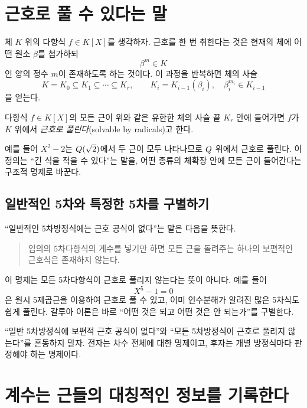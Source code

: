 \section{근호로 풀 수 있다는 말}

체 $K$ 위의 다항식 $f\in K[X]$를 생각하자. 근호를 한 번 취한다는 것은 현재의 체에 어떤 원소 $\beta$를 첨가하되
\[
  \beta^m\in K
\]
인 양의 정수 $m$이 존재하도록 하는 것이다. 이 과정을 반복하면 체의 사슬
\[
  K=K_0\subseteq K_1\subseteq\cdots\subseteq K_r,
  \qquad
  K_i=K_{i-1}(\beta_i),\quad
  \beta_i^{m_i}\in K_{i-1}
\]
을 얻는다.

\begin{definition}[근호에 의한 해법]
다항식 $f\in K[X]$의 모든 근이 위와 같은 유한한 체의 사슬 끝 $K_r$ 안에 들어가면 $f$가 $K$ 위에서 \emph{근호로 풀린다}(solvable by radicals)고 한다.
\end{definition}

예를 들어 $X^2-2$는 $Q(\sqrt2)$에서 두 근이 모두 나타나므로 $Q$ 위에서 근호로 풀린다. 이 정의는 ``긴 식을 적을 수 있다''는 말을, 어떤 종류의 체확장 안에 모든 근이 들어간다는 구조적 명제로 바꾼다.

\subsection{일반적인 5차와 특정한 5차를 구별하기}

``일반적인 5차방정식에는 근호 공식이 없다''는 말은 다음을 뜻한다.

\begin{quote}
임의의 5차다항식의 계수를 넣기만 하면 모든 근을 돌려주는 하나의 보편적인 근호식은 존재하지 않는다.
\end{quote}

이 명제는 모든 5차다항식이 근호로 풀리지 않는다는 뜻이 아니다. 예를 들어
\[
  X^5-1=0
\]
은 원시 5제곱근을 이용하여 근호로 풀 수 있고, 이미 인수분해가 알려진 많은 5차식도 쉽게 풀린다. 갈루아 이론은 바로 ``어떤 것은 되고 어떤 것은 안 되는가''를 구별한다.

\begin{pitfall}
``일반 5차방정식에 보편적 근호 공식이 없다''와 ``모든 5차방정식이 근호로 풀리지 않는다''를 혼동하지 말자. 전자는 차수 전체에 대한 명제이고, 후자는 개별 방정식마다 판정해야 하는 명제이다.
\end{pitfall}

\section{계수는 근들의 대칭적인 정보를 기록한다}

